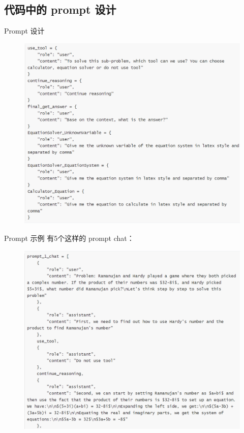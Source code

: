 \subsection{代码中的 prompt 设计}


\begin{frame}{Prompt 设计}
    \begin{figure}
        \centering
        \includegraphics[width=.5\linewidth]{./pic/1.png}
    \end{figure}
\end{frame}


\begin{frame}{Prompt 示例}
    有5个这样的 prompt chat：
    \begin{figure}
        \centering
        \includegraphics[width=.5\linewidth]{./pic/2.png}
    \end{figure}

\end{frame}



